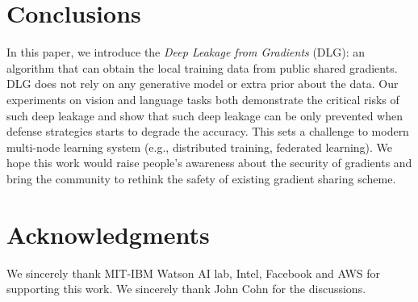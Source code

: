 \section{Conclusions}

In this paper, we introduce the \emph{Deep Leakage from Gradients} (DLG): an algorithm that can obtain the local training data from public shared gradients. 
% 
DLG does not rely on any generative model or extra prior about the data. Our experiments on vision and language tasks both demonstrate the critical risks of such deep leakage and show that such deep leakage can be only prevented when defense strategies starts to degrade the accuracy.
%
This sets a challenge to modern multi-node learning system (e.g., distributed training, federated learning).
% 
We hope this work would raise people's awareness about the security of gradients and bring the community to rethink the safety of existing gradient sharing scheme. 


\section*{Acknowledgments}

We sincerely thank MIT-IBM Watson AI lab, Intel, Facebook and AWS for supporting this work. We sincerely thank John Cohn for the discussions. 

